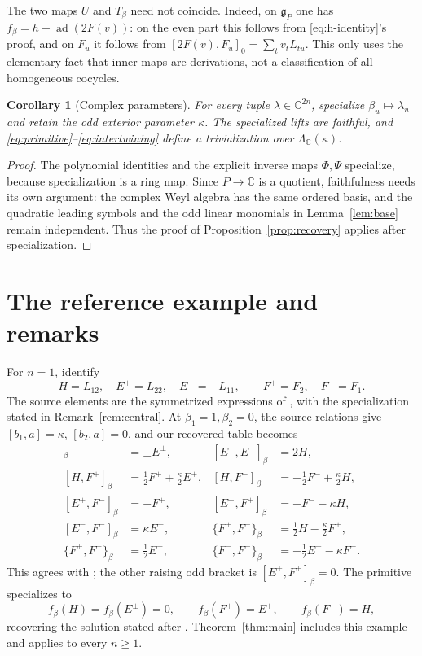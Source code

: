 \documentclass[11pt]{article}
\numberwithin{equation}{section}
\newtheorem{corollary}[theorem]{Corollary}
\theoremstyle{remark}
\begin{document}
The two maps $U$ and $T_\beta$ need not coincide. Indeed, on
$\mathfrak g_P$ one has $f_\beta=h-\operatorname{ad}(2F(v))$: on the even
part this follows from \eqref{eq:h-identity}'s proof, and on $F_u$ it follows
from $[2F(v),F_u]_0=\sum_t v_tL_{tu}$. This only uses the elementary fact
that inner maps are derivations, not a classification of all homogeneous cocycles.

\begin{corollary}[Complex parameters]\label{cor:complex}
For every tuple $\lambda\in\mathbb C^{2n}$, specialize $\beta_u\mapsto\lambda_u$
and retain the odd exterior parameter $\kappa$. The specialized lifts are
faithful, and \eqref{eq:primitive}--\eqref{eq:intertwining} define a trivialization
over $\Lambda_{\mathbb C}(\kappa)$.
\end{corollary}
\begin{proof}
The polynomial identities and the explicit inverse maps $\Phi,\Psi$
specialize, because specialization is a ring map. Since $P\to\mathbb C$ is a
quotient, faithfulness needs its own argument: the complex Weyl algebra has the
same ordered basis, and the quadratic leading symbols and the odd linear
monomials in Lemma~\ref{lem:base} remain independent. Thus the proof of
Proposition~\ref{prop:recovery} applies
after specialization.
\end{proof}

\section{The reference example and remarks}\label{sec:comparison}

For $n=1$, identify
\begin{equation}\label{eq:reference-dictionary}
 H=L_{12},\quad E^+=L_{22},\quad E^-=-L_{11},\qquad
 F^+=F_2,\quad F^-=F_1.
\end{equation}
The source elements are the symmetrized expressions of
\cite[Equation~(4.3)]{BS17}, with the specialization stated in
Remark~\ref{rem:central}. At $\beta_1=1,\beta_2=0$, the source relations give
$[b_1,a]=\kappa$, $[b_2,a]=0$, and our recovered table becomes
\begin{align*}
 [H,E^\pm]_\beta&=\pm E^\pm,& [E^+,E^-]_\beta&=2H,\\
 [H,F^+]_\beta&=\tfrac{1}{2}F^++\tfrac{\kappa}{2}E^+,&
 [H,F^-]_\beta&=-\tfrac{1}{2}F^-+\tfrac{\kappa}{2}H,\\
 [E^+,F^-]_\beta&=-F^+,& [E^-,F^+]_\beta&=-F^--\kappa H,\\
 [E^-,F^-]_\beta&=\kappa E^-,&
 \{F^+,F^-\}_\beta&=\tfrac{1}{2}H-\tfrac{\kappa}{2}F^+,\\
 \{F^+,F^+\}_\beta&=\tfrac{1}{2}E^+,&
 \{F^-,F^-\}_\beta&=-\tfrac{1}{2}E^--\kappa F^-.
\end{align*}
This agrees with \cite[Equation~(4.4)]{BS17}; the other raising odd bracket is
$[E^+,F^+]_\beta=0$. The primitive specializes to
\[
 f_\beta(H)=f_\beta(E^\pm)=0,\qquad
 f_\beta(F^+)=E^+,\qquad f_\beta(F^-)=H,
\]
recovering the solution stated after \cite[Equation~(4.5)]{BS17}.
Theorem~\ref{thm:main} includes this example and applies to every $n\geq1$.
\end{document}
